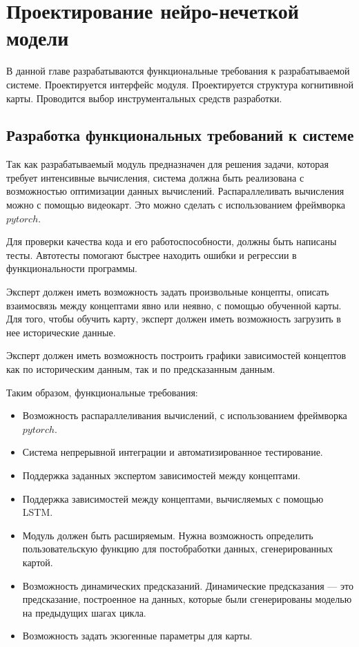 \chapter{Проектирование нейро-нечеткой модели}

В данной главе разрабатываются функциональные требования к разрабатываемой системе.
Проектируется интерфейс модуля. Проектируется структура когнитивной карты.
Проводится выбор инструментальных средств разработки.

\section{Разработка функциональных требований к системе}

Так как разрабатываемый модуль предназначен для решения задачи, которая
требует интенсивные вычисления, система должна быть реализована
с возможностью оптимизации данных вычислений. Распараллеливать вычисления
можно с помощью видеокарт. Это можно сделать с использованием фреймворка $ pytorch $.

Для проверки качества кода и его работоспособности, должны быть написаны тесты.
Автотесты помогают быстрее находить ошибки и регрессии в функциональности программы.

Эксперт должен иметь возможность задать произвольные концепты, описать
взаимосвязь между концептами явно или неявно, с помощью обученной карты.
Для того, чтобы обучить карту, эксперт должен иметь возможность загрузить
в нее исторические данные.

Эксперт должен иметь возможность построить графики зависимостей концептов
как по историческим данным, так и по предсказанным данным.

Таким образом, функциональные требования:
\begin{itemize}
	\item Возможность распараллеливания вычислений, с использованием фреймворка $pytorch$.
	\item Система непрерывной интеграции и автоматизированное тестирование.
	\item Поддержка заданных экспертом зависимостей между концептами.
	\item Поддержка зависимостей между концептами, вычисляемых с помощью LSTM.
	\item Модуль должен быть расширяемым. Нужна возможность определить пользовательскую функцию для постобработки данных, сгенерированных картой.
	\item Возможность динамических предсказаний. Динамические предсказания --- это
	предсказание, построенное на данных, которые были сгенерированы моделью на предыдущих шагах цикла.
	\item Возможность задать экзогенные параметры для карты.
\end{itemize}

